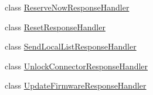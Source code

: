 \begin{DoxyCompactItemize}
\item 
class \hyperlink{classde_1_1rwth_1_1idsg_1_1steve_1_1handler_1_1ocpp15_1_1_reserve_now_response_handler}{Reserve\+Now\+Response\+Handler}
\item 
class \hyperlink{classde_1_1rwth_1_1idsg_1_1steve_1_1handler_1_1ocpp15_1_1_reset_response_handler}{Reset\+Response\+Handler}
\item 
class \hyperlink{classde_1_1rwth_1_1idsg_1_1steve_1_1handler_1_1ocpp15_1_1_send_local_list_response_handler}{Send\+Local\+List\+Response\+Handler}
\item 
class \hyperlink{classde_1_1rwth_1_1idsg_1_1steve_1_1handler_1_1ocpp15_1_1_unlock_connector_response_handler}{Unlock\+Connector\+Response\+Handler}
\item 
class \hyperlink{classde_1_1rwth_1_1idsg_1_1steve_1_1handler_1_1ocpp15_1_1_update_firmware_response_handler}{Update\+Firmware\+Response\+Handler}
\end{DoxyCompactItemize}

